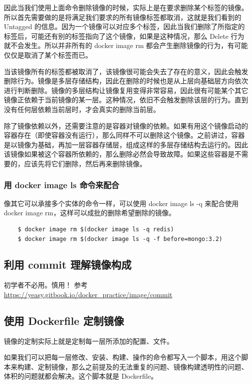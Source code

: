 \documentclass[UTF8]{ctexart}
\begin{document}
因此当我们使用上面命令删除镜像的时候，实际上是在要求删除某个标签的镜像。所以首先需要做的是将满足我们要求的所有镜像标签都取消，这就是我们看到的 Untagged 的信息。因为一个镜像可以对应多个标签，因此当我们删除了所指定的标签后，可能还有别的标签指向了这个镜像，如果是这种情况，那么 Delete 行为就不会发生。所以并非所有的 docker image rm 都会产生删除镜像的行为，有可能仅仅是取消了某个标签而已。

当该镜像所有的标签都被取消了，该镜像很可能会失去了存在的意义，因此会触发删除行为。镜像是多层存储结构，因此在删除的时候也是从上层向基础层方向依次进行判断删除。镜像的多层结构让镜像复用变得非常容易，因此很有可能某个其它镜像正依赖于当前镜像的某一层。这种情况，依旧不会触发删除该层的行为。直到没有任何层依赖当前层时，才会真实的删除当前层。

除了镜像依赖以外，还需要注意的是容器对镜像的依赖。如果有用这个镜像启动的容器存在（即使容器没有运行），那么同样不可以删除这个镜像。之前讲过，容器是以镜像为基础，再加一层容器存储层，组成这样的多层存储结构去运行的。因此该镜像如果被这个容器所依赖的，那么删除必然会导致故障。如果这些容器是不需要的，应该先将它们删除，然后再来删除镜像。

\subsubsection*{用 docker image ls 命令来配合}
像其它可以承接多个实体的命令一样，可以使用 docker image ls -q 来配合使用 docker image rm，这样可以成批的删除希望删除的镜像。
\begin{lstlisting}
    $ docker image rm $(docker image ls -q redis)
    $ docker image rm $(docker image ls -q -f before=mongo:3.2)
\end{lstlisting}

\subsection{利用 commit 理解镜像构成}
初学者不必用。慎用！ 参考 \url{https://yeasy.gitbook.io/docker_practice/image/commit}

\subsection{使用 Dockerfile 定制镜像}
镜像的定制实际上就是定制每一层所添加的配置、文件。

如果我们可以把每一层修改、安装、构建、操作的命令都写入一个脚本，用这个脚本来构建、定制镜像，那么之前提及的无法重复的问题、镜像构建透明性的问题、体积的问题就都会解决。这个脚本就是 Dockerfile。
\end{document}
